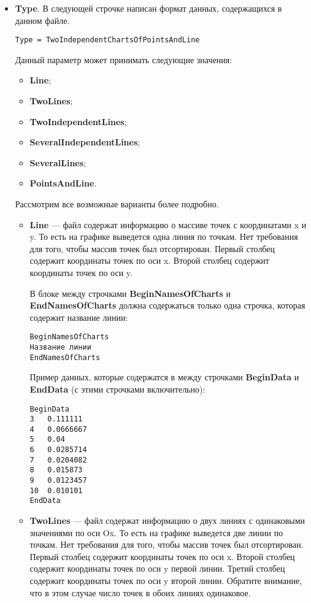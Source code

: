 \documentclass[a4paper,12pt]{article}
\begin{document}
\begin{itemize}
\item \textbf{Type}.
В следующей строчке написан формат данных, содержащихся в данном файле.
\begin{lstlisting}[label=Line03,caption=Строчка с описанием типа данных в файле]
Type = TwoIndependentChartsOfPointsAndLine
\end{lstlisting}
Данный параметр может принимать следующие значения:

\begin{itemize}
\item \textbf{Line};
\item \textbf{TwoLines};
\item \textbf{TwoIndependentLines};
\item \textbf{SeveralIndependentLines};
\item \textbf{SeveralLines};
\item \textbf{PointsAndLine}.
\end{itemize}

Рассмотрим все возможные варианты более подробно.

\begin{itemize}
\item \textbf{Line} --- файл содержат информацию о массиве точек с координатами x и y. То есть на графике выведется одна линия по точкам. Нет требования для того, чтобы массив точек был отсортирован.  Первый столбец содержит координаты точек по оси x. Второй столбец содержит координаты точек по оси y.

В блоке между строчками \textbf{BeginNamesOfCharts} и \textbf{EndNamesOfCharts} должна содержаться только одна строчка, которая содержит название линии:
\begin{lstlisting}[label=Line03_2,caption=Для Line ]
BeginNamesOfCharts
Название линии
EndNamesOfCharts
\end{lstlisting}

Пример данных, которые содержатся в между строчками \textbf{BeginData} и \textbf{EndData} (с этими строчками включительно):
\begin{lstlisting}[label=Line03_3,caption=Для Line ]
BeginData
3	0.111111
4	0.0666667
5	0.04
6	0.0285714
7	0.0204082
8	0.015873
9	0.0123457
10	0.010101
EndData
\end{lstlisting}

\item \textbf{TwoLines} --- файл содержат информацию о двух линиях с одинаковыми значениями по оси Ox. То есть на графике выведется две линии по точкам. Нет требования для того, чтобы массив точек был отсортирован. Первый столбец содержит координаты точек по оси x. Второй столбец содержит координаты точек по оси y первой линии. Третий столбец содержит координаты точек по оси y второй линии. Обратите внимание, что в этом случае число точек в обоих линиях одинаковое.


\end{itemize}
\end{itemize}
\end{document}
